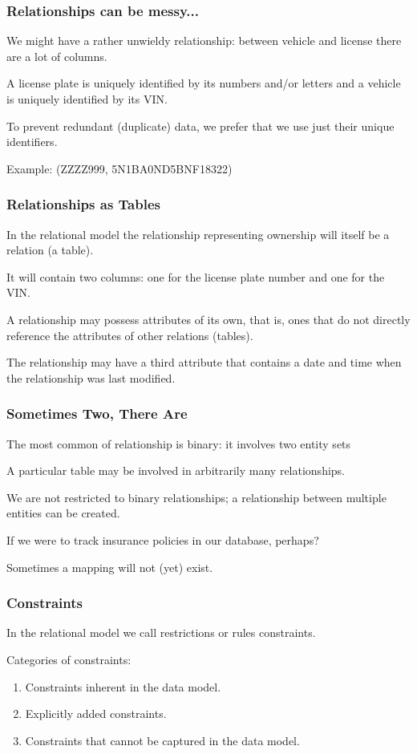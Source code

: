 \begin{frame}
\frametitle{Relationships can be messy...}

We might have a rather unwieldy relationship: between vehicle and license there are a lot of columns. 

A license plate is uniquely identified by its numbers and/or letters and a vehicle is uniquely identified by its VIN. 

To prevent redundant (duplicate) data, we prefer that we use just their unique identifiers. 

Example:  (ZZZZ999, 5N1BA0ND5BNF18322)

\end{frame}



\begin{frame}
\frametitle{Relationships as Tables}

In the relational model the relationship representing ownership will itself be a relation (a table). 

It will contain two columns: one for the license plate number and one for the VIN. 

A relationship may possess attributes of its own, that is, ones that do not directly reference the attributes of other relations (tables). 

The relationship may have a third attribute that contains a date and time when the relationship was last modified.

\end{frame}



\begin{frame}
\frametitle{Sometimes Two, There Are}

The most common of relationship is binary: it involves two entity sets 

A particular table may be involved in arbitrarily many relationships. 

We are not restricted to binary relationships; a relationship between multiple entities can be created. 

If we were to track insurance policies in our database, perhaps?

Sometimes a mapping will not (yet) exist.

\end{frame}



\begin{frame}
\frametitle{Constraints}

In the relational model we call restrictions or rules constraints.

Categories of constraints:

\begin{enumerate}
\item Constraints inherent in the data model.
\item Explicitly added constraints.
\item Constraints that cannot be captured in the data model. 
\end{enumerate}

\end{frame}



